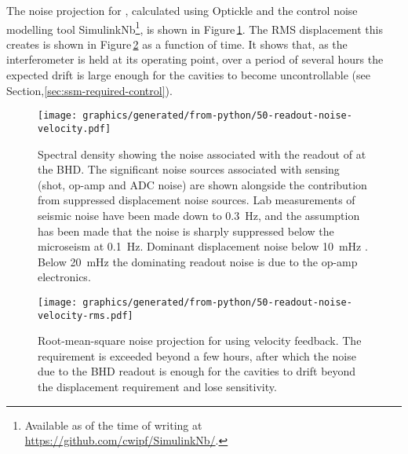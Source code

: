 The noise projection for \LMINUS{}, calculated using Optickle and the control noise modelling tool SimulinkNb\footnote{Available as of the time of writing at \url{https://github.com/cwipf/SimulinkNb/}.}, is shown in Figure\,\ref{fig:readout-noise-velocity}. The \gls{RMS} \LMINUS{} displacement this creates is shown in Figure\,\ref{fig:readout-noise-velocity-rms} as a function of time. It shows that, as the interferometer is held at its operating point, over a period of several hours the expected drift is large enough for the cavities to become uncontrollable (see Section,\ref{sec:ssm-required-control}).

\begin{figure}
  \centering
  \texttt{[image: graphics/generated/from-python/50-readout-noise-velocity.pdf]}
  \caption[Noise projection for \LMINUS{} using velocity feedback]{\label{fig:readout-noise-velocity}Spectral density showing the noise associated with the readout of \LMINUS{} at the BHD. The significant noise sources associated with sensing (shot, op-amp and ADC noise) are shown alongside the contribution from suppressed displacement noise sources. Lab measurements of seismic noise have been made down to \SI{0.3}{\hertz}, and the assumption has been made that the noise is sharply suppressed below the microseism at \SI{0.1}{\hertz}. Dominant displacement noise below \SI{10}{\milli\hertz} . Below \SI{20}{\milli\hertz} the dominating readout noise is due to the op-amp electronics.}
\end{figure}

\begin{figure}
  \centering
  \texttt{[image: graphics/generated/from-python/50-readout-noise-velocity-rms.pdf]}
  \caption[Root-mean-square noise projection for \LMINUS{} using velocity feedback]{\label{fig:readout-noise-velocity-rms}Root-mean-square noise projection for \LMINUS{} using velocity feedback. The requirement is exceeded beyond a few hours, after which the noise due to the BHD readout is enough for the cavities to drift beyond the displacement requirement and lose sensitivity.}
\end{figure}

